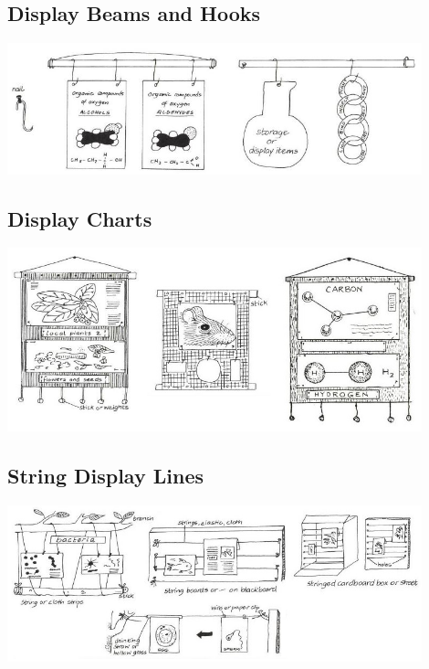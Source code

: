 \subsection{Display Beams and Hooks}

\begin{center}
\includegraphics[width=12cm]{./img/vso/display-beams-hooks.jpg}
\end{center}

\subsection{Display Charts}

\begin{center}
\includegraphics[width=12cm]{./img/vso/display-charts.jpg}
\end{center}

%

\subsection{String Display Lines}

\begin{center}
\includegraphics[width=12cm]{./img/vso/string-display.jpg}
\end{center}

